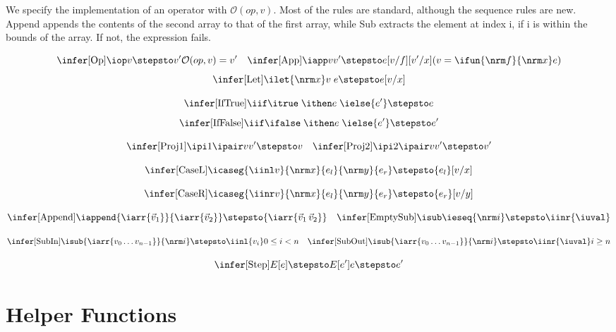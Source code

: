 We specify the implementation of an operator with
$\mathcal{O}({op},v)$. Most of the rules are standard, although the
sequence rules are new. Append appends the contents of the second
array to that of the first array, while Sub extracts the element at
index i, if i is within the bounds of the array. If not, the
expression fails.

\[
\infer[\text{Op}]{
  \iop v \stepsto v'
}{
  \mathcal{O}({op},v) = v'
}
\quad
\infer[\text{App}]{
  \iapp v {v'} \stepsto e[v/f][v'/x]
}{
  (v = \ifun {\nrm f}{\nrm x} e)
}
\]
\[%
\infer[\text{Let}]{
  \ilet {\nrm x} v \; e
  \stepsto e[v/x]
}{}
\]

\[
\infer[\text{{IfTrue}}]{
  \iif \itrue \; \ithen e \; \ielse {e'} \stepsto
  e
}{}
\]
\[%
\infer[\text{{IfFalse}}]{
  \iif \ifalse \; \ithen e \; \ielse {e'} \stepsto
  e'
}{}
\]

\[
\infer[\text{Proj1}]{
  \ipi 1 {\ipair v {v'}} \stepsto v
}{}
\quad
\infer[\text{Proj2}]{
  \ipi 2 {\ipair v {v'}} \stepsto v'
}{}
\]

\[
\infer[\text{CaseL}]{
  \icaseg{\iinl v}{\nrm x}{e_l}{\nrm y}{e_r}
  \stepsto {e_l}[v/x]
}{}
\]

\[%
\infer[\text{CaseR}]{
  \icaseg{\iinr v}{\nrm x}{e_l}{\nrm y}{e_r}
  \stepsto {e_r}[v/y]
}{}
\]

\[
\infer[\text{Append}]{
  \iappend {\iarr{\vec v_1}} {\iarr{\vec v_2}} \stepsto
  {\iarr{\vec v_1 \, \vec v_2}}
}{}
\quad
\infer[\text{EmptySub}]{
  \isub \ieseq {\nrm i} \stepsto \iinr{\iuval}
}{}
\]

\[
\infer[\text{SubIn}]{
  \isub {\iarr{v_0 \ldots v_{n-1}}} {\nrm i}
  \stepsto \iinl {v_{i}}
}{
  0 \leq i < n
}
\quad
\infer[\text{SubOut}]{
  \isub {\iarr{v_0 \ldots v_{n-1}}} {\nrm i}
  \stepsto \iinr{\iuval}
}{
  i \geq n
}
\]

\[
\infer[\text{Step}]{
  E[e] \stepsto E[e']
}{
  e \stepsto e'
}
\]

\section{Helper Functions}
\label{app:asst-functions}


